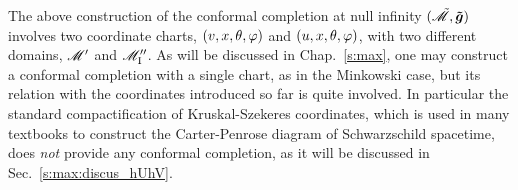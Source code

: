 \begin{remark}
The above construction of the conformal completion at null infinity
$(\tilde{\mathscr{M}},\bm{\tilde{g}})$ involves two coordinate charts,
$(v,x,\theta,\varphi)$ and $(u,x,\theta,\varphi)$, with two different
domains, $\mathscr{M}'$ and $\mathscr{M}''_{\rm I}$.
As will be discussed in Chap.~\ref{s:max},
one may construct a conformal completion
with a single chart, as in the Minkowski case, but its relation with
the coordinates introduced so far is quite involved.
In particular the standard compactification of Kruskal-Szekeres coordinates,
which is used in many textbooks to construct the Carter-Penrose diagram
of Schwarzschild spacetime, does \emph{not} provide any
conformal completion, as it will be discussed in
Sec.~\ref{s:max:discus_hUhV}.
\end{remark}

